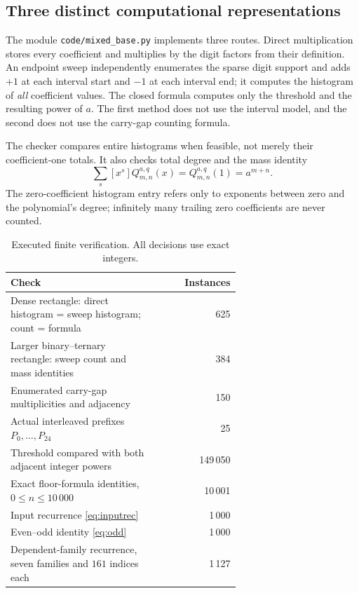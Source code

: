 \documentclass[11pt,letterpaper]{article}
\numberwithin{equation}{section}
\theoremstyle{definition}
\theoremstyle{remark}
\begin{document}
\subsection{Three distinct computational representations}
The module \texttt{code/mixed\_base.py} implements three routes.
Direct multiplication stores every coefficient and multiplies by the digit
factors from their definition. An endpoint sweep independently enumerates
the sparse digit support and adds $+1$ at each interval start and $-1$ at
each interval end; it computes the histogram of \emph{all} coefficient
values. The closed formula computes only the threshold and the resulting
power of $a$. The first method does not use the interval model, and the
second does not use the carry-gap counting formula.

The checker compares entire histograms when feasible, not merely their
coefficient-one totals. It also checks total degree and the mass identity
\[
 \sum_s[x^s]Q^{a,q}_{m,n}(x)=Q^{a,q}_{m,n}(1)=a^{m+n}.
\]
The zero-coefficient histogram entry refers only to exponents between zero
and the polynomial's degree; infinitely many trailing zero coefficients
are never counted.

\begin{table}[htbp]
\centering
\caption{Executed finite verification. All decisions use exact integers.}
\label{tab:verification}
\begin{tabular}{>{\raggedright\arraybackslash}p{0.65\linewidth}r}
\toprule
Check&Instances\\
\midrule
Dense rectangle: direct histogram = sweep histogram; count = formula&625\\
Larger binary--ternary rectangle: sweep count and mass identities&384\\
Enumerated carry-gap multiplicities and adjacency&150\\
Actual interleaved prefixes $P_0,\ldots,P_{24}$&25\\
Threshold compared with both adjacent integer powers&149\,050\\
Exact floor-formula identities, $0\le n\le10\,000$&10\,001\\
Input recurrence \eqref{eq:inputrec}&1\,000\\
Even--odd identity \eqref{eq:odd}&1\,000\\
Dependent-family recurrence, seven families and $161$ indices each&1\,127\\
\bottomrule
\end{tabular}
\end{table}
\end{document}

